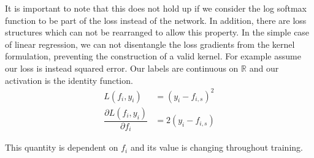 It is important to note that this does not hold up if we consider the log softmax function to be part of the loss instead of the network.
In addition, there are loss structures which can not be rearranged to allow this property.
In the simple case of linear regression, we can not disentangle the loss gradients from the kernel formulation, preventing the construction of a valid kernel. 
For example assume our loss is instead squared error. Our labels are continuous on $\mathds{R}$ and our activation is the identity function.
\begin{align}
    L(f_i,  y_i) 
    &= (y_i - f_{i, s})^2 \\
    \dfrac{\partial L(f_i,  y_i)}{\partial f_i} &= 2(y_i- f_{i, s})
\end{align}

This quantity is dependent on $f_i$ and its value is changing throughout training. %

